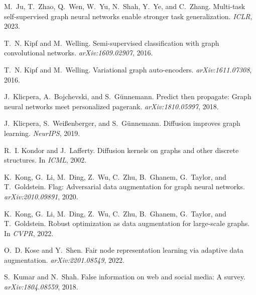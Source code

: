 \documentclass[11pt]{article}
\begin{document}
\begin{thebibliography}{10}
\begin{small}
M.~Ju, T.~Zhao, Q.~Wen, W.~Yu, N.~Shah, Y.~Ye, and C.~Zhang.
\newblock Multi-task self-supervised graph neural networks enable stronger task
  generalization.
\newblock \emph{ICLR}, 2023.

T.~N. Kipf and M.~Welling.
\newblock Semi-supervised classification with graph convolutional networks.
\newblock \emph{arXiv:1609.02907}, 2016{}.

T.~N. Kipf and M.~Welling.
\newblock Variational graph auto-encoders.
\newblock \emph{arXiv:1611.07308}, 2016{}.

J.~Klicpera, A.~Bojchevski, and S.~G{\"u}nnemann.
\newblock Predict then propagate: Graph neural networks meet personalized
  pagerank.
\newblock \emph{arXiv:1810.05997}, 2018.

J.~Klicpera, S.~Wei{\ss}enberger, and S.~G{\"u}nnemann.
\newblock Diffusion improves graph learning.
\newblock \emph{NeurIPS}, 2019.

R.~I. Kondor and J.~Lafferty.
\newblock Diffusion kernels on graphs and other discrete structures.
\newblock In \emph{ICML}, 2002.

K.~Kong, G.~Li, M.~Ding, Z.~Wu, C.~Zhu, B.~Ghanem, G.~Taylor, and T.~Goldstein.
\newblock Flag: Adversarial data augmentation for graph neural networks.
\newblock \emph{arXiv:2010.09891}, 2020.

K.~Kong, G.~Li, M.~Ding, Z.~Wu, C.~Zhu, B.~Ghanem, G.~Taylor, and T.~Goldstein.
\newblock Robust optimization as data augmentation for large-scale graphs.
\newblock In \emph{CVPR}, 2022.

O.~D. Kose and Y.~Shen.
\newblock Fair node representation learning via adaptive data augmentation.
\newblock \emph{arXiv:2201.08549}, 2022.

S.~Kumar and N.~Shah.
\newblock False information on web and social media: A survey.
\newblock \emph{arXiv:1804.08559}, 2018.


\end{small}
\end{thebibliography}
\end{document}
